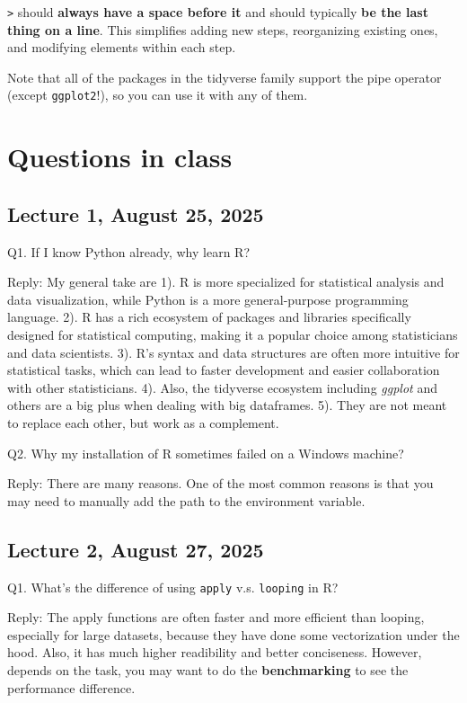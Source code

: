 \documentclass[
  letterpaper,
  DIV=11,
  numbers=noendperiod]{scrreprt}
\begin{document}
\texttt{\textbar{}\textgreater{}} should \textbf{always have a space
before it} and should typically \textbf{be the last thing on a line}.
This simplifies adding new steps, reorganizing existing ones, and
modifying elements within each step.

Note that all of the packages in the tidyverse family support the pipe
operator (except \texttt{ggplot2}!), so you can use it with any of them.

\section{Questions in class}\label{questions-in-class}

\subsection{Lecture 1, August 25, 2025}\label{lecture-1-august-25-2025}

Q1. If I know Python already, why learn R?

Reply: My general take are 1). R is more specialized for statistical
analysis and data visualization, while Python is a more general-purpose
programming language. 2). R has a rich ecosystem of packages and
libraries specifically designed for statistical computing, making it a
popular choice among statisticians and data scientists. 3). R's syntax
and data structures are often more intuitive for statistical tasks,
which can lead to faster development and easier collaboration with other
statisticians. 4). Also, the tidyverse ecosystem including \emph{ggplot}
and others are a big plus when dealing with big dataframes. 5). They are
not meant to replace each other, but work as a complement.

Q2. Why my installation of R sometimes failed on a Windows machine?

Reply: There are many reasons. One of the most common reasons is that
you may need to manually add the path to the environment variable.

\subsection{Lecture 2, August 27, 2025}\label{lecture-2-august-27-2025}

Q1. What's the difference of using \texttt{apply} v.s. \texttt{looping}
in R?

Reply: The apply functions are often faster and more efficient than
looping, especially for large datasets, because they have done some
vectorization under the hood. Also, it has much higher readibility and
better conciseness. However, depends on the task, you may want to do the
\textbf{benchmarking} to see the performance difference.
\end{document}
